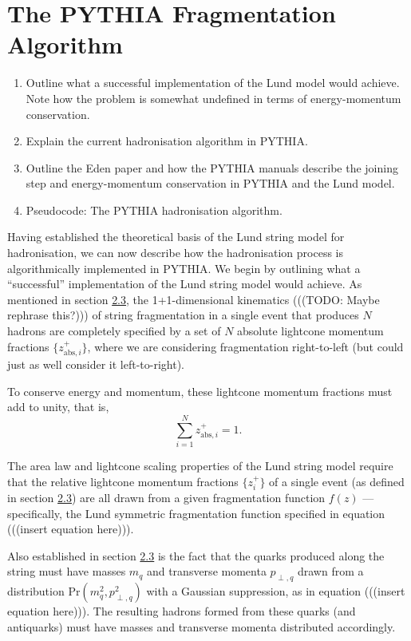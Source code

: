 \documentclass[12pt,a4paper]{report}
\begin{document}
\section{The PYTHIA Fragmentation Algorithm}
\begin{enumerate}
\item Outline what a successful implementation of the Lund model would achieve. Note how the problem is somewhat undefined in terms of energy-momentum conservation. 
\item Explain the current hadronisation algorithm in PYTHIA.
\item Outline the Eden paper and how the PYTHIA manuals describe the joining step and energy-momentum conservation in PYTHIA and the Lund model.
\item Pseudocode: The PYTHIA hadronisation algorithm.
  
\end{enumerate}

Having established the theoretical basis of the Lund string model for hadronisation, we can now describe how the hadronisation process is algorithmically implemented in PYTHIA. We begin by outlining what a ``successful'' implementation of the Lund string model would achieve. As mentioned in section \hyperref[sec:lsm]{2.3}, the 1+1-dimensional kinematics (((TODO: Maybe rephrase this?))) of string fragmentation in a single event that produces $N$ hadrons are completely specified by a set of $N$ absolute lightcone momentum fractions $\{ z_{\text{abs},i}^+ \}$, where we are considering fragmentation right-to-left (but could just as well consider it left-to-right).

To conserve energy and momentum, these lightcone momentum fractions must add to unity, that is,
\begin{equation}
  \sum_{i=1}^N z_{\text{abs},i}^+ = 1.
\end{equation}

The area law and lightcone scaling properties of the Lund string model require that the relative lightcone momentum fractions $\{ z_i^+ \}$ of a single event (as defined in section \hyperref[sec:lsm]{2.3}) are all drawn from a given fragmentation function $f(z)$ --- specifically, the Lund symmetric fragmentation function specified in equation (((insert equation here))).

Also established in section \hyperref[sec:lsm]{2.3} is the fact that the quarks produced along the string must have masses $m_q$ and transverse momenta $p_{\perp,q}$ drawn from a distribution $\text{Pr}(m_q^2, p_{\perp,q}^2)$ with a Gaussian suppression, as in equation (((insert equation here))). The resulting hadrons formed from these quarks (and antiquarks) must have masses and transverse momenta distributed accordingly.
\end{document}

